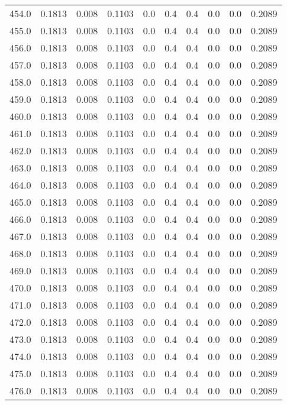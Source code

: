 \begin{longtable}{lrrrrrrrrr}
454.0 & 0.1813 & 0.008 & 0.1103 & 0.0 & 0.4 & 0.4 & 0.0 & 0.0 & 0.2089 \\
455.0 & 0.1813 & 0.008 & 0.1103 & 0.0 & 0.4 & 0.4 & 0.0 & 0.0 & 0.2089 \\
456.0 & 0.1813 & 0.008 & 0.1103 & 0.0 & 0.4 & 0.4 & 0.0 & 0.0 & 0.2089 \\
457.0 & 0.1813 & 0.008 & 0.1103 & 0.0 & 0.4 & 0.4 & 0.0 & 0.0 & 0.2089 \\
458.0 & 0.1813 & 0.008 & 0.1103 & 0.0 & 0.4 & 0.4 & 0.0 & 0.0 & 0.2089 \\
459.0 & 0.1813 & 0.008 & 0.1103 & 0.0 & 0.4 & 0.4 & 0.0 & 0.0 & 0.2089 \\
460.0 & 0.1813 & 0.008 & 0.1103 & 0.0 & 0.4 & 0.4 & 0.0 & 0.0 & 0.2089 \\
461.0 & 0.1813 & 0.008 & 0.1103 & 0.0 & 0.4 & 0.4 & 0.0 & 0.0 & 0.2089 \\
462.0 & 0.1813 & 0.008 & 0.1103 & 0.0 & 0.4 & 0.4 & 0.0 & 0.0 & 0.2089 \\
463.0 & 0.1813 & 0.008 & 0.1103 & 0.0 & 0.4 & 0.4 & 0.0 & 0.0 & 0.2089 \\
464.0 & 0.1813 & 0.008 & 0.1103 & 0.0 & 0.4 & 0.4 & 0.0 & 0.0 & 0.2089 \\
465.0 & 0.1813 & 0.008 & 0.1103 & 0.0 & 0.4 & 0.4 & 0.0 & 0.0 & 0.2089 \\
466.0 & 0.1813 & 0.008 & 0.1103 & 0.0 & 0.4 & 0.4 & 0.0 & 0.0 & 0.2089 \\
467.0 & 0.1813 & 0.008 & 0.1103 & 0.0 & 0.4 & 0.4 & 0.0 & 0.0 & 0.2089 \\
468.0 & 0.1813 & 0.008 & 0.1103 & 0.0 & 0.4 & 0.4 & 0.0 & 0.0 & 0.2089 \\
469.0 & 0.1813 & 0.008 & 0.1103 & 0.0 & 0.4 & 0.4 & 0.0 & 0.0 & 0.2089 \\
470.0 & 0.1813 & 0.008 & 0.1103 & 0.0 & 0.4 & 0.4 & 0.0 & 0.0 & 0.2089 \\
471.0 & 0.1813 & 0.008 & 0.1103 & 0.0 & 0.4 & 0.4 & 0.0 & 0.0 & 0.2089 \\
472.0 & 0.1813 & 0.008 & 0.1103 & 0.0 & 0.4 & 0.4 & 0.0 & 0.0 & 0.2089 \\
473.0 & 0.1813 & 0.008 & 0.1103 & 0.0 & 0.4 & 0.4 & 0.0 & 0.0 & 0.2089 \\
474.0 & 0.1813 & 0.008 & 0.1103 & 0.0 & 0.4 & 0.4 & 0.0 & 0.0 & 0.2089 \\
475.0 & 0.1813 & 0.008 & 0.1103 & 0.0 & 0.4 & 0.4 & 0.0 & 0.0 & 0.2089 \\
476.0 & 0.1813 & 0.008 & 0.1103 & 0.0 & 0.4 & 0.4 & 0.0 & 0.0 & 0.2089 \\

\end{longtable}
